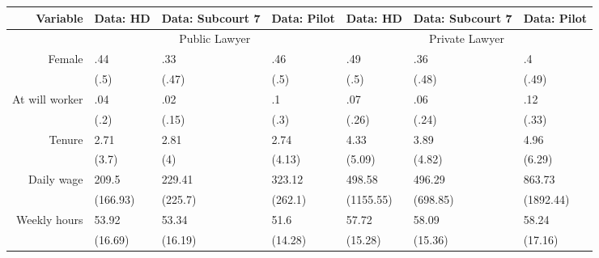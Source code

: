 \begin{tabular}{rrrrrrr}
\toprule
Variable & Data: HD & Data: Subcourt 7 & Data: Pilot & Data: HD & Data: Subcourt 7 & Data: Pilot \\
\toprule
      & \multicolumn{3}{c}{Public Lawyer} & \multicolumn{3}{c}{Private Lawyer} \\
      \midrule
      \midrule
Female & \multicolumn{1}{l}{.44} & \multicolumn{1}{l}{.33} & \multicolumn{1}{l}{.46} & \multicolumn{1}{l}{.49} & \multicolumn{1}{l}{.36} & \multicolumn{1}{l}{.4} \\
      & \multicolumn{1}{l}{(.5)} & \multicolumn{1}{l}{(.47)} & \multicolumn{1}{l}{(.5)} & \multicolumn{1}{l}{(.5)} & \multicolumn{1}{l}{(.48)} & \multicolumn{1}{l}{(.49)} \\
At will worker & \multicolumn{1}{l}{.04} & \multicolumn{1}{l}{.02} & \multicolumn{1}{l}{.1} & \multicolumn{1}{l}{.07} & \multicolumn{1}{l}{.06} & \multicolumn{1}{l}{.12} \\
      & \multicolumn{1}{l}{(.2)} & \multicolumn{1}{l}{(.15)} & \multicolumn{1}{l}{(.3)} & \multicolumn{1}{l}{(.26)} & \multicolumn{1}{l}{(.24)} & \multicolumn{1}{l}{(.33)} \\
Tenure & \multicolumn{1}{l}{2.71} & \multicolumn{1}{l}{2.81} & \multicolumn{1}{l}{2.74} & \multicolumn{1}{l}{4.33} & \multicolumn{1}{l}{3.89} & \multicolumn{1}{l}{4.96} \\
      & \multicolumn{1}{l}{(3.7)} & \multicolumn{1}{l}{(4)} & \multicolumn{1}{l}{(4.13)} & \multicolumn{1}{l}{(5.09)} & \multicolumn{1}{l}{(4.82)} & \multicolumn{1}{l}{(6.29)} \\
Daily wage & \multicolumn{1}{l}{209.5} & \multicolumn{1}{l}{229.41} & \multicolumn{1}{l}{323.12} & \multicolumn{1}{l}{498.58} & \multicolumn{1}{l}{496.29} & \multicolumn{1}{l}{863.73} \\
      & \multicolumn{1}{l}{(166.93)} & \multicolumn{1}{l}{(225.7)} & \multicolumn{1}{l}{(262.1)} & \multicolumn{1}{l}{(1155.55)} & \multicolumn{1}{l}{(698.85)} & \multicolumn{1}{l}{(1892.44)} \\
Weekly hours & \multicolumn{1}{l}{53.92} & \multicolumn{1}{l}{53.34} & \multicolumn{1}{l}{51.6} & \multicolumn{1}{l}{57.72} & \multicolumn{1}{l}{58.09} & \multicolumn{1}{l}{58.24} \\
      & \multicolumn{1}{l}{(16.69)} & \multicolumn{1}{l}{(16.19)} & \multicolumn{1}{l}{(14.28)} & \multicolumn{1}{l}{(15.28)} & \multicolumn{1}{l}{(15.36)} & \multicolumn{1}{l}{(17.16)} \\

\end{tabular}
